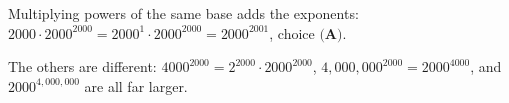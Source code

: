 Multiplying powers of the same base adds the exponents: $2000\cdot2000^{2000}=2000^1\cdot2000^{2000}=2000^{2001}$, choice $\boxed{\textbf{(A)}}$.

The others are different: $4000^{2000}=2^{2000}\cdot2000^{2000}$, $4{,}000{,}000^{2000}=2000^{4000}$, and $2000^{4{,}000{,}000}$ are all far larger.
